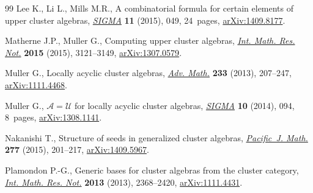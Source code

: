 \documentclass[10pt,a4paper]{amsart}
\numberwithin{equation}{section}
\begin{document}
\begin{thebibliography}{99}
Lee K., Li L., Mills M.R., A combinatorial formula for certain elements of
 upper cluster algebras, \href{https://doi.org/10.3842/SIGMA.2015.049}{\textit{SIGMA}} \textbf{11} (2015), 049, 24~pages,
 \href{https://arxiv.org/abs/1409.8177}{arXiv:1409.8177}.

Matherne J.P., Muller G., Computing upper cluster algebras, \href{https://doi.org/10.1093/imrn/rnu027}{\textit{Int. Math.
 Res. Not.}} \textbf{2015} (2015), 3121--3149, \href{https://arxiv.org/abs/1307.0579}{arXiv:1307.0579}.

Muller G., Locally acyclic cluster algebras, \href{https://doi.org/10.1016/j.aim.2012.10.002}{\textit{Adv. Math.}} \textbf{233}
 (2013), 207--247, \href{https://arxiv.org/abs/1111.4468}{arXiv:1111.4468}.

Muller G., {${\mathcal A}={\mathcal U}$} for locally acyclic cluster algebras,
 \href{https://doi.org/10.3842/SIGMA.2014.094}{\textit{SIGMA}} \textbf{10} (2014), 094, 8~pages, \href{https://arxiv.org/abs/1308.1141}{arXiv:1308.1141}.

Nakanishi T., Structure of seeds in generalized cluster algebras,
 \href{https://doi.org/10.2140/pjm.2015.277.201}{\textit{Pacific~J. Math.}} \textbf{277} (2015), 201--217, \href{https://arxiv.org/abs/1409.5967}{arXiv:1409.5967}.

Plamondon P.-G., Generic bases for cluster algebras from the cluster category,
 \href{https://doi.org/10.1093/imrn/rns102}{\textit{Int. Math. Res. Not.}} \textbf{2013} (2013), 2368--2420,
 \href{https://arxiv.org/abs/1111.4431}{arXiv:1111.4431}.

\end{thebibliography}
\end{document}
